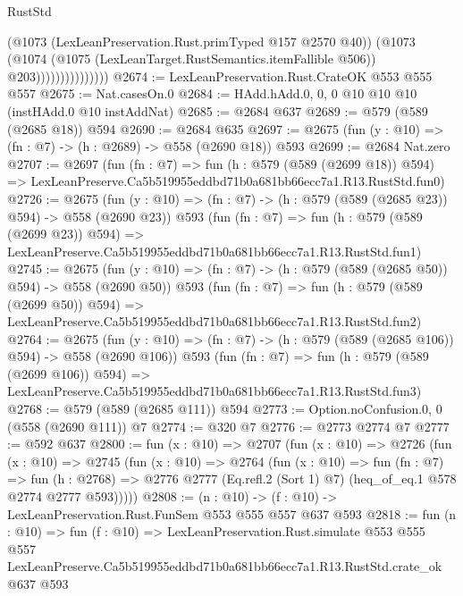 \begin{lexlean}{RustStd}
\begin{coremodule}
                              (@1073 (LexLeanPreservation.Rust.primTyped @157 @2570 @40))
                              (@1073
                                (@1074
                                  (@1075 (LexLeanTarget.RustSemantics.itemFallible @506))
                                  @203)))))))))))))))
@2674 := LexLeanPreservation.Rust.CrateOK @553 @555 @557
@2675 := Nat.casesOn.{0}
@2684 := HAdd.hAdd.{0, 0, 0} @10 @10 @10 (instHAdd.{0} @10 instAddNat)
@2685 := @2684 @637
@2689 := @579 (@589 (@2685 @18)) @594
@2690 := @2684 @635
@2697 := @2675 (fun (y : @10) => (fn : @7) -> (h : @2689) -> @558 (@2690 @18)) @593
@2699 := @2684 Nat.zero
@2707 := @2697
    (fun (fn : @7) =>
    fun (h : @579 (@589 (@2699 @18)) @594) =>
    LexLeanPreserve.Ca5b519955eddbd71b0a681bb66ecc7a1.R13.RustStd.fun0)
@2726 := @2675
    (fun (y : @10) => (fn : @7) -> (h : @579 (@589 (@2685 @23)) @594) -> @558 (@2690 @23))
    @593
    (fun (fn : @7) =>
    fun (h : @579 (@589 (@2699 @23)) @594) =>
    LexLeanPreserve.Ca5b519955eddbd71b0a681bb66ecc7a1.R13.RustStd.fun1)
@2745 := @2675
    (fun (y : @10) => (fn : @7) -> (h : @579 (@589 (@2685 @50)) @594) -> @558 (@2690 @50))
    @593
    (fun (fn : @7) =>
    fun (h : @579 (@589 (@2699 @50)) @594) =>
    LexLeanPreserve.Ca5b519955eddbd71b0a681bb66ecc7a1.R13.RustStd.fun2)
@2764 := @2675
    (fun (y : @10) => (fn : @7) -> (h : @579 (@589 (@2685 @106)) @594) -> @558 (@2690 @106))
    @593
    (fun (fn : @7) =>
    fun (h : @579 (@589 (@2699 @106)) @594) =>
    LexLeanPreserve.Ca5b519955eddbd71b0a681bb66ecc7a1.R13.RustStd.fun3)
@2768 := @579 (@589 (@2685 @111)) @594
@2773 := Option.noConfusion.{0, 0} (@558 (@2690 @111)) @7
@2774 := @320 @7
@2776 := @2773 @2774 @7
@2777 := @592 @637
@2800 := fun (x : @10) =>
  @2707
    (fun (x : @10) =>
    @2726
      (fun (x : @10) =>
      @2745
        (fun (x : @10) =>
        @2764
          (fun (x : @10) =>
          fun (fn : @7) =>
          fun (h : @2768) =>
          @2776 @2777 (Eq.refl.{2} (Sort 1) @7) (heq_of_eq.{1} @578 @2774 @2777 @593)))))
@2808 := (n : @10) -> (f : @10) -> LexLeanPreservation.Rust.FunSem @553 @555 @557 @637 @593
@2818 := fun (n : @10) =>
  fun (f : @10) =>
  LexLeanPreservation.Rust.simulate
    @553
    @555
    @557
    LexLeanPreserve.Ca5b519955eddbd71b0a681bb66ecc7a1.R13.RustStd.crate_ok
    @637
    @593
\end{coremodule}
\end{lexlean}
